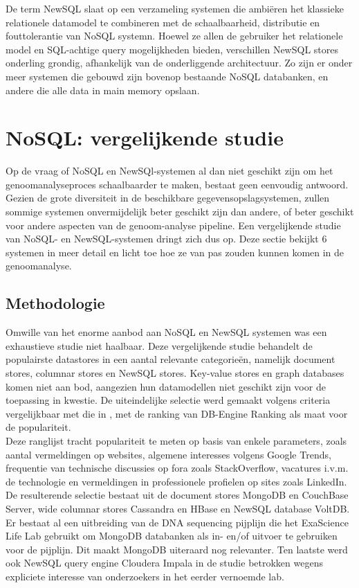 De term NewSQL slaat op een verzameling systemen die ambi\"eren het klassieke relationele datamodel te combineren met de schaalbaarheid, distributie en fouttolerantie van NoSQL systemn. Hoewel ze allen de gebruiker het relationele model en SQL-achtige query mogelijkheden bieden, verschillen NewSQL stores onderling grondig, afhankelijk van de onderliggende architectuur. Zo zijn er onder meer systemen die gebouwd zijn bovenop bestaande NoSQL databanken, en andere die alle data in main memory opslaan.\cite{grolinger2013data}

\section{NoSQL: vergelijkende studie}
\label{nosql_survey}

Op de vraag of NoSQL en NewSQl-systemen al dan niet geschikt zijn om het genoomanalyseproces schaalbaarder te maken, bestaat geen eenvoudig antwoord. Gezien de grote diversiteit in de beschikbare gegevensopslagsystemen, zullen sommige systemen onvermijdelijk beter geschikt zijn dan andere, of beter geschikt voor andere aspecten van de genoom-analyse pipeline. Een vergelijkende studie van NoSQL- en NewSQL-systemen dringt zich dus op. Deze sectie bekijkt 6 systemen in meer detail en licht toe hoe ze van pas zouden kunnen komen in de genoomanalyse.

\subsection{Methodologie}

Omwille van het enorme aanbod aan NoSQL en NewSQL systemen was een exhaustieve studie niet haalbaar. Deze vergelijkende studie behandelt de populairste datastores in een aantal relevante categorie\"en, namelijk document stores, columnar stores en NewSQL stores. Key-value stores en graph databases komen niet aan bod, aangezien hun datamodellen niet geschikt zijn voor de toepassing in kwestie. De uiteindelijke selectie werd gemaakt volgens criteria vergelijkbaar met die in \cite{grolinger2013data}, met de ranking van DB-Engine Ranking \cite{db_engine_rank} als maat voor de populariteit.\\

Deze ranglijst tracht populariteit te meten op basis van enkele parameters, zoals aantal vermeldingen op websites, algemene interesses volgens Google Trends, frequentie van technische discussies op fora zoals StackOverflow, vacatures i.v.m. de technologie en vermeldingen in professionele profielen op sites zoals LinkedIn. De resulterende selectie bestaat uit de document stores MongoDB en CouchBase Server, wide columnar stores Cassandra en HBase en NewSQL database VoltDB. Er bestaat al een uitbreiding van de DNA sequencing pijplijn die het ExaScience Life Lab gebruikt om MongoDB  databanken als in- en/of uitvoer te gebruiken voor de pijplijn. Dit maakt MongoDB uiteraard nog relevanter. Ten laatste werd ook NewSQL query engine Cloudera Impala in de studie betrokken wegens expliciete interesse van onderzoekers in het eerder vernoemde lab.

